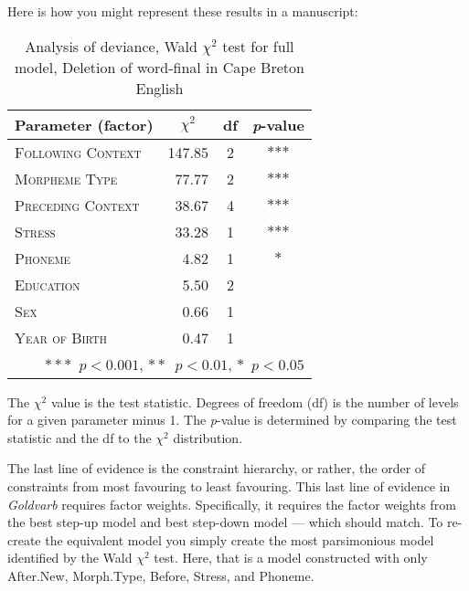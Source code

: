 \documentclass[
  10pt,
  letterpaper]{article}
\renewcommand\texttt[1]{{\ttfamily\color{BrickRed}#1}}
\begin{document}
Here is how you might represent these results in a manuscript:

\begin{table}[h]
\noindent
\begin{center}
\begin{threeparttable}
\caption{Analysis of deviance, Wald $\chi^2$ test for full model,  Deletion of word-final  in Cape Breton English}

\begin{tabular}{lrcc}
\toprule
Parameter (factor) &   \multicolumn{1}{c}{$\chi^2$}&df  &\multicolumn{1}{c}{\textit{p}-value}\\
\midrule
\textsc{Following Context} & 147.85& 2  & $\ast$$\ast$$\ast$\\
\textsc{Morpheme Type} & 77.77 & 2   & $\ast$$\ast$$\ast$\\
\textsc{Preceding Context} & 38.67&4 &$\ast$$\ast$$\ast$\\
\textsc{Stress} & 33.28 & 1& $\ast$$\ast$$\ast$\\
\textsc{Phoneme} & 4.82& 1  &$\ast$\\
\textsc{Education} & 5.50& 2  &\\
\textsc{Sex} & 0.66& 1  &\\
\textsc{Year of Birth} & 0.47 & 1 &\\
\midrule
\multicolumn{4}{r}{ $\ast\ast\ast$~$p<0.001$,  $\ast\ast$~$p<0.01$, $\ast$~$p<0.05$}\\
\bottomrule
\end{tabular}
\begin{tablenotes}
\item  The $\chi^2$ value is the test statistic. Degrees of freedom (df) is the number of levels for a given parameter minus 1. The \textit{p}-value is determined by comparing the test statistic and the df to the $\chi^2$ distribution.
\end{tablenotes}
\end{threeparttable}
\end{center}
\end{table}

The last line of evidence is the constraint hierarchy, or rather, the
order of constraints from most favouring to least favouring. This last
line of evidence in \emph{Goldvarb} requires factor weights.
Specifically, it requires the factor weights from the best step-up model
and best step-down model --- which should match. To re-create the
equivalent model you simply create the most parsimonious model
identified by the Wald \(\chi^2\) test. Here, that is a model
constructed with only \texttt{After.New}, \texttt{Morph.Type},
\texttt{Before}, \texttt{Stress}, and \texttt{Phoneme}.
\end{document}
